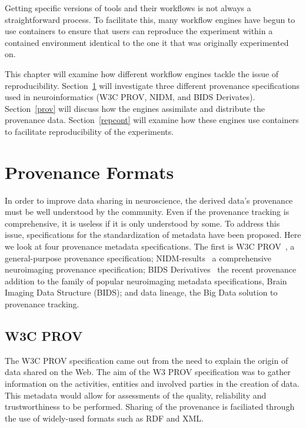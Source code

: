 \documentclass{report}
\begin{document}
        Getting specific versions of tools and their workflows is not always 
        a straightforward process. To facilitate this, many workflow engines
        have begun to use containers to ensure that users can reproduce the 
        experiment within a contained environment identical to the one it that
        was originally experimented on. 

        This chapter will examine how different workflow engines tackle the 
        issue of reproducibility. Section~\ref{metadata} will investigate three 
        different provenance specifications used in neuroinformatics (W3C PROV, NIDM,
        and BIDS Derivates). Section~\ref{prov} will discuss how the 
        engines assimilate and distribute the provenance data. 
        Section~\ref{repcont} will examine how these engines use containers to
        facilitate reproducibility of the experiments.
        \section{Provenance Formats}\label{metadata}
            In order to improve data sharing in 
            neuroscience, the derived data's provenance must be well understood
            by the community. Even if the provenance tracking is comprehensive,
            it is useless if it is only understood by some. To address this 
            issue, specifications for the standardization of metadata have been 
            proposed. Here we look at four provenance metadata specifications.
            The first is W3C PROV~\cite{missier2013w3c}, a general-purpose provenance specification; 
            NIDM-results~\cite{Maumet:2016aa}
            a comprehensive neuroimaging provenance specification; BIDS 
            Derivatives~\cite{bidsderiv} the recent provenance addition to the family of 
            popular neuroimaging metadata specifications, Brain Imaging Data Structure (BIDS); 
            and data lineage, the Big Data solution to provenance tracking.

            \subsection{W3C PROV}
            The W3C PROV specification came out from the need to explain the 
            origin of data shared on the Web. 
            The aim of the W3 PROV specification was to gather information on
            the activities, entities and involved parties in the creation of 
            data. This metadata would allow for assessments of the quality, 
            reliability and trustworthiness to be performed. Sharing of the 
            provenance is faciliated through the use of widely-used formats 
            such as RDF and XML. 
\end{document}
